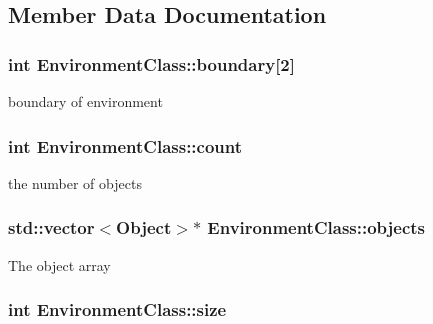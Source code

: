\subsection{Member Data Documentation}
\hypertarget{classEnvironmentClass_a48581ef606b9f769046d56553766bae6}{
\subsubsection[{boundary}]{\setlength{\rightskip}{0pt plus 5cm}int Environment\-Class\-::boundary\mbox{[}2\mbox{]}\hspace{0.3cm}{\ttfamily [private]}}}\label{classEnvironmentClass_a48581ef606b9f769046d56553766bae6}
boundary of environment \hypertarget{classEnvironmentClass_a9a5b37410d83d107ab1b5d2912fc0a87}{
\subsubsection[{count}]{\setlength{\rightskip}{0pt plus 5cm}int Environment\-Class\-::count\hspace{0.3cm}{\ttfamily [private]}}}\label{classEnvironmentClass_a9a5b37410d83d107ab1b5d2912fc0a87}
the number of objects \hypertarget{classEnvironmentClass_a76496bf077c5d0a89a42ab752330e546}{
\subsubsection[{objects}]{\setlength{\rightskip}{0pt plus 5cm}std\-::vector$<${\bf Object}$>$$\ast$ Environment\-Class\-::objects\hspace{0.3cm}{\ttfamily [private]}}}\label{classEnvironmentClass_a76496bf077c5d0a89a42ab752330e546}
The object array \hypertarget{classEnvironmentClass_a62183824ee7d890044558c6c235bd86e}{
\subsubsection[{size}]{\setlength{\rightskip}{0pt plus 5cm}int Environment\-Class\-::size\hspace{0.3cm}{\ttfamily [private]}}}\label{classEnvironmentClass_a62183824ee7d890044558c6c235bd86e}
